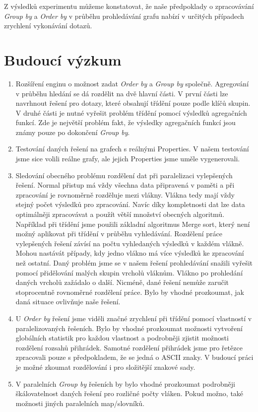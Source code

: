 Z výsledků experimentu můžeme konstatovat, že naše předpoklady o zpracovávání \textit{Group by} a \textit{Order by} v průběhu prohledávání grafu nabízí v určitých případech zrychlení vykonávání dotazů.

\section*{Budoucí výzkum}

\begin{enumerate}

\item Rozšíření enginu o možnost zadat \textit{Order by} a \textit{Group by} společně.
Agregování v průběhu hledání se dá rozdělit na dvě hlavní části.
V první části lze navrhnout řešení pro dotazy, které obsahují třídění pouze podle klíčů skupin.
V druhé části je nutné vyřešit problém třídění pomocí výsledků agregačních funkcí.
Zde je největší problém fakt, že výsledky agregačních funkcí jsou známy pouze po dokončení \textit{Group by}.

\item Testování daných řešení na grafech s reálnými Properties.
V našem testování jsme sice volili reálne grafy, ale jejich Properties jsme uměle vygenerovali.

\item Sledování obecného problému rozdělení dat při paralelizaci vylepšených řešení. 
Normal přistup má vždy všechna data připravená v paměti a při zpracování je rovnoměrně rozděluje mezi vlákny.
Vlákna tedy mají vždy stejný počet výsledků pro zpracování.
Navíc díky kompletnosti dat lze data optimálněji zpracovávat a použít větší množství obecných algoritmů.
Například při třídění jsme použili základní algoritmus Merge sort, který není možný aplikovat při třídění v průběhu vyhledávání.  
Rozdělení práce vylepšených řešení závísí na počtu vyhledaných výsledků v každém vlákně.
Mohou nastávát případy, kdy jedno vlákno má více výsledků ke zpracování než ostatní. 
Daný problém jsme se v našem řešení prohledávání snažili vyřešit pomocí přidělování malých skupin vrcholů vláknům.
Vlákno po prohledání daných vrcholů zažádalo o další.
Nicméně, dané řešení nemůže zaručit stoprocentně rovnoměrné rozdělení práce.
Bylo by vhodné prozkoumat, jak daná situace ovlivňuje naše řešení.

\item U \textit{Order by} řešení jsme viděli značné zrychlení při třídění pomocí vlastností v paralelizovaných řešeních.
Bylo by vhodné prozkoumat možnosti vytvoření globálních statistik pro každou vlastnost a podrobněji zjistit možnosti rozdělení rozsahů přihrádek.
Samotné rozdělení přihrádek jsme pro řetězce zpracovali pouze s předpokladem, že se jedná o ASCII znaky.
V budoucí práci je možné zkoumat rozdělování i pro složitější znakové sady.

\item V paralelních \textit{Group by} řešeních by bylo vhodné prozkoumat podrobněji škálovatelnost daných řešení pro rozličné počty vláken.
Pokud možno, také možnosti jiných paralelních map/slovníků.
 
\end{enumerate}